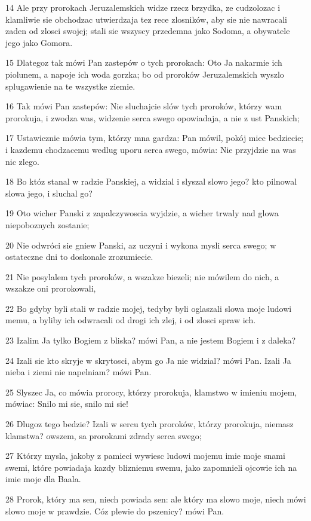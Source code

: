\par 14 Ale przy prorokach Jeruzalemskich widze rzecz brzydka, ze cudzolozac i klamliwie sie obchodzac utwierdzaja tez rece zlosników, aby sie nie nawracali zaden od zlosci swojej; stali sie wszyscy przedemna jako Sodoma, a obywatele jego jako Gomora.
\par 15 Dlategoz tak mówi Pan zastepów o tych prorokach: Oto Ja nakarmie ich piolunem, a napoje ich woda gorzka; bo od proroków Jeruzalemskich wyszlo splugawienie na te wszystke ziemie.
\par 16 Tak mówi Pan zastepów: Nie sluchajcie slów tych proroków, którzy wam prorokuja, i zwodza was, widzenie serca swego opowiadaja, a nie z ust Panskich;
\par 17 Ustawicznie mówia tym, którzy mna gardza: Pan mówil, pokój miec bedziecie; i kazdemu chodzacemu wedlug uporu serca swego, mówia: Nie przyjdzie na was nic zlego.
\par 18 Bo któz stanal w radzie Panskiej, a widzial i slyszal slowo jego? kto pilnowal slowa jego, i sluchal go?
\par 19 Oto wicher Panski z zapalczywoscia wyjdzie, a wicher trwaly nad glowa niepoboznych zostanie;
\par 20 Nie odwróci sie gniew Panski, az uczyni i wykona mysli serca swego; w ostateczne dni to doskonale zrozumiecie.
\par 21 Nie posylalem tych proroków, a wszakze biezeli; nie mówilem do nich, a wszakze oni prorokowali,
\par 22 Bo gdyby byli stali w radzie mojej, tedyby byli oglaszali slowa moje ludowi memu, a byliby ich odwracali od drogi ich zlej, i od zlosci spraw ich.
\par 23 Izalim Ja tylko Bogiem z bliska? mówi Pan, a nie jestem Bogiem i z daleka?
\par 24 Izali sie kto skryje w skrytosci, abym go Ja nie widzial? mówi Pan. Izali Ja nieba i ziemi nie napelniam? mówi Pan.
\par 25 Slyszec Ja, co mówia prorocy, którzy prorokuja, klamstwo w imieniu mojem, mówiac: Snilo mi sie, snilo mi sie!
\par 26 Dlugoz tego bedzie? Izali w sercu tych proroków, którzy prorokuja, niemasz klamstwa? owszem, sa prorokami zdrady serca swego;
\par 27 Którzy mysla, jakoby z pamieci wywiesc ludowi mojemu imie moje snami swemi, które powiadaja kazdy blizniemu swemu, jako zapomnieli ojcowie ich na imie moje dla Baala.
\par 28 Prorok, który ma sen, niech powiada sen: ale który ma slowo moje, niech mówi slowo moje w prawdzie. Cóz plewie do pszenicy? mówi Pan.
